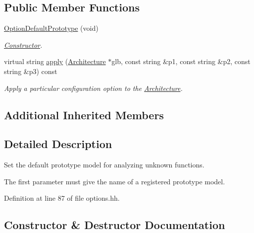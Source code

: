 \subsection*{Public Member Functions}
\begin{DoxyCompactItemize}
\item 
\mbox{\hyperlink{class_option_default_prototype_a16b82f075c887a015ab0d6c813167d65}{Option\+Default\+Prototype}} (void)
\begin{DoxyCompactList}\small\item\em \mbox{\hyperlink{class_constructor}{Constructor}}. \end{DoxyCompactList}\item 
virtual string \mbox{\hyperlink{class_option_default_prototype_af350045f3bd78a0f63b8788fa21ee7f2}{apply}} (\mbox{\hyperlink{class_architecture}{Architecture}} $\ast$glb, const string \&p1, const string \&p2, const string \&p3) const
\begin{DoxyCompactList}\small\item\em Apply a particular configuration option to the \mbox{\hyperlink{class_architecture}{Architecture}}. \end{DoxyCompactList}\end{DoxyCompactItemize}
\subsection*{Additional Inherited Members}


\subsection{Detailed Description}
Set the default prototype model for analyzing unknown functions. 

The first parameter must give the name of a registered prototype model. 

Definition at line 87 of file options.\+hh.



\subsection{Constructor \& Destructor Documentation}
\mbox{\label{class_option_default_prototype_a16b82f075c887a015ab0d6c813167d65}} 
